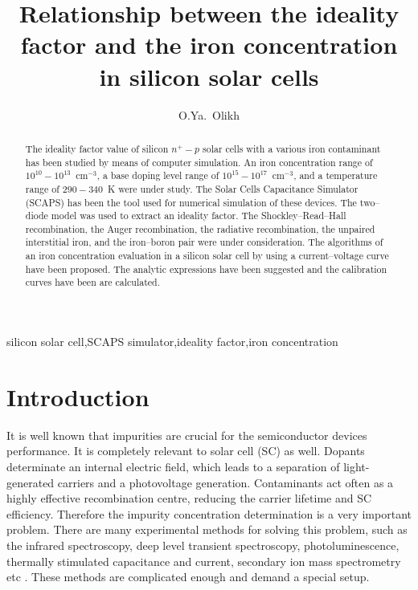 \documentclass [sort&compress] {elsarticle}
\begin{document}
\begin{frontmatter}

\title{Relationship between the ideality factor and the iron concentration in silicon solar cells}

\author{O.Ya.~Olikh}

\address{Faculty of Physics, Taras Shevchenko National University of Kyiv, Kyiv 01601, Ukraine}


\begin{abstract}
The ideality factor value of silicon $n^+-p$ solar cells with a various iron contaminant has been studied by means of computer simulation.
An iron concentration range of $10^{10}-10^{13}$~cm$^{-3}$, a base doping level range of $10^{15}-10^{17}$~cm$^{-3}$, and a temperature range of $290-340$~K were under study.
The Solar Cells Capacitance Simulator (SCAPS) has been the tool used for numerical simulation of these devices.
The two--diode model was used to extract an  ideality factor.
The Shockley--Read--Hall recombination, the Auger recombination, the radiative recombination, the unpaired interstitial iron, and
the iron--boron pair were under consideration.
The algorithms of an iron concentration evaluation in a silicon solar cell by using a current--voltage curve have been proposed.
The analytic expressions have been suggested and the calibration curves have been are calculated.
\end{abstract}


\begin{keyword}
silicon solar cell\sep SCAPS simulator\sep ideality factor\sep iron concentration
\end{keyword}


\end{frontmatter}


\section{Introduction}

It is well known that impurities are crucial for the semiconductor devices performance.
It is completely relevant to solar cell (SC) as well.
Dopants determinate an internal electric field, which leads to a separation of light-generated carriers and a photovoltage generation.
Contaminants act often as a highly effective recombination centre, reducing the carrier lifetime and SC efficiency.
Therefore the impurity concentration determination is a very important problem.
There are many experimental methods for solving this problem, such as the infrared spectroscopy, deep level transient spectroscopy, photoluminescence,
thermally stimulated capacitance and current, secondary ion mass spectrometry etc \cite{Schroder2006}.
These methods are complicated  enough and demand a special setup.
\end{document}
